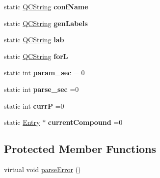 \begin{DoxyCompactItemize}
\mbox{\label{classvhdl_1_1parser_1_1_vhdl_parser_acc074e42edc6e707aa452b9fd6d95f64}} 
static \mbox{\hyperlink{class_q_c_string}{Q\+C\+String}} {\bfseries conf\+Name}
\item 
\mbox{\label{classvhdl_1_1parser_1_1_vhdl_parser_a00f4c198682533fc112558693edbd109}} 
static \mbox{\hyperlink{class_q_c_string}{Q\+C\+String}} {\bfseries gen\+Labels}
\item 
\mbox{\label{classvhdl_1_1parser_1_1_vhdl_parser_a8d38501a1d648f05291e19ed09bc712c}} 
static \mbox{\hyperlink{class_q_c_string}{Q\+C\+String}} {\bfseries lab}
\item 
\mbox{\label{classvhdl_1_1parser_1_1_vhdl_parser_a3a3166528cb644ed4aa63717896c74b8}} 
static \mbox{\hyperlink{class_q_c_string}{Q\+C\+String}} {\bfseries forL}
\item 
\mbox{\label{classvhdl_1_1parser_1_1_vhdl_parser_a25f544fa6e6df5f6b653dacd8a0b9aa5}} 
static int {\bfseries param\+\_\+sec} = 0
\item 
\mbox{\label{classvhdl_1_1parser_1_1_vhdl_parser_a84ab425ec2f89225d2c362e5721c938c}} 
static int {\bfseries parse\+\_\+sec} =0
\item 
\mbox{\label{classvhdl_1_1parser_1_1_vhdl_parser_a25aa858671fabb47bec4a6ba116af200}} 
static int {\bfseries currP} =0
\item 
\mbox{\label{classvhdl_1_1parser_1_1_vhdl_parser_a1898e11f45e236b4f245cbcffaa200a5}} 
static \mbox{\hyperlink{class_entry}{Entry}} $\ast$ {\bfseries current\+Compound} =0
\end{DoxyCompactItemize}
\subsection*{Protected Member Functions}
\begin{DoxyCompactItemize}
\item 
virtual void \mbox{\hyperlink{classvhdl_1_1parser_1_1_vhdl_parser_a3e87ec86b2b0a06929dcb23c7bf38622}{parse\+Error}} ()
\end{DoxyCompactItemize}
